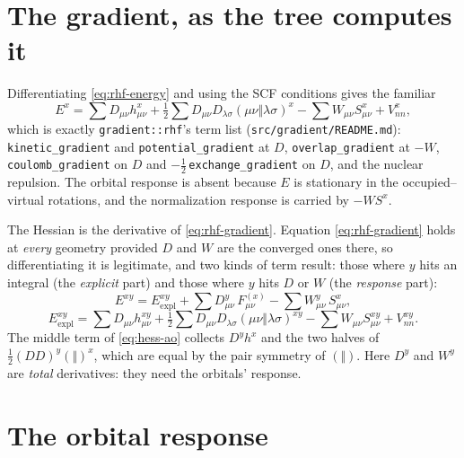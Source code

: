 \documentclass[11pt]{article}
\newcommand{\code}[1]{\texttt{#1}}
\newcommand{\asym}[2]{(#1\Vert#2)}
\newcommand{\Fsk}[1]{F^{(#1)}}
\newcommand{\Exy}{E^{xy}}
\begin{document}
\section{The gradient, as the tree computes it}
\label{sec:rhf-gradient}

Differentiating \eqref{eq:rhf-energy} and using the SCF conditions gives the
familiar
\begin{equation}
  E^x = \sum D_{\mu\nu} h^x_{\mu\nu}
  + \tfrac12 \sum D_{\mu\nu} D_{\lambda\sigma}
    \asym{\mu\nu}{\lambda\sigma}^x
  - \sum W_{\mu\nu} S^x_{\mu\nu} + V_{nn}^x,
  \label{eq:rhf-gradient}
\end{equation}
which is exactly \code{gradient::rhf}'s term list
(\code{src/gradient/README.md}): \code{kinetic\_gradient} and
\code{potential\_gradient} at $D$, \code{overlap\_gradient} at $-W$,
\code{coulomb\_gradient} on $D$ and $-\frac12$\,\code{exchange\_gradient}
on $D$, and the nuclear repulsion. The orbital response is absent because
$E$ is stationary in the occupied--virtual rotations, and the normalization
response is carried by $-W S^x$.

The Hessian is the derivative of \eqref{eq:rhf-gradient}. Equation
\eqref{eq:rhf-gradient} holds at \emph{every} geometry provided $D$ and $W$
are the converged ones there, so differentiating it is legitimate, and two
kinds of term result: those where $y$ hits an integral (the \emph{explicit}
part) and those where $y$ hits $D$ or $W$ (the \emph{response} part):
\begin{equation}
  \Exy = \Exy_{\mathrm{expl}}
  + \sum D^y_{\mu\nu}\,\Fsk{x}_{\mu\nu}
  - \sum W^y_{\mu\nu}\,S^x_{\mu\nu},
  \label{eq:hess-ao}
\end{equation}
\begin{equation}
  \Exy_{\mathrm{expl}} = \sum D_{\mu\nu} h^{xy}_{\mu\nu}
  + \tfrac12 \sum D_{\mu\nu} D_{\lambda\sigma}
    \asym{\mu\nu}{\lambda\sigma}^{xy}
  - \sum W_{\mu\nu} S^{xy}_{\mu\nu} + V_{nn}^{xy}.
  \label{eq:explicit}
\end{equation}
The middle term of \eqref{eq:hess-ao} collects $D^y h^x$ and the two halves
of $\frac12 (D D)^y \asym{}{}^x$, which are equal by the pair symmetry of
$\asym{}{}$. Here $D^y$ and $W^y$ are \emph{total} derivatives: they need
the orbitals' response.

\section{The orbital response}
\label{sec:response}
\end{document}
